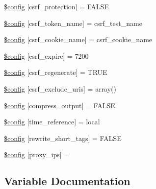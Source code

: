\begin{DoxyCompactItemize}
\item 
\hyperlink{_admin_2application_2config_2config_8php_a37f959c7a92cefa11c0df7db2b83c89f}{\$config} \mbox{[}\textquotesingle{}csrf\+\_\+protection\textquotesingle{}\mbox{]} = F\+A\+L\+S\+E
\item 
\hyperlink{_admin_2application_2config_2config_8php_af0e5ccff5383b00a56f4ad3ee0d289d2}{\$config} \mbox{[}\textquotesingle{}csrf\+\_\+token\+\_\+name\textquotesingle{}\mbox{]} = \textquotesingle{}csrf\+\_\+test\+\_\+name\textquotesingle{}
\item 
\hyperlink{_admin_2application_2config_2config_8php_ad8f36090649afb3101c3c337c1d722a1}{\$config} \mbox{[}\textquotesingle{}csrf\+\_\+cookie\+\_\+name\textquotesingle{}\mbox{]} = \textquotesingle{}csrf\+\_\+cookie\+\_\+name\textquotesingle{}
\item 
\hyperlink{_admin_2application_2config_2config_8php_af5c0ea7b77c40439da4f23b7cbb9c2e4}{\$config} \mbox{[}\textquotesingle{}csrf\+\_\+expire\textquotesingle{}\mbox{]} = 7200
\item 
\hyperlink{_admin_2application_2config_2config_8php_a5dfd346cc2377cb9dceafc813eb0d801}{\$config} \mbox{[}\textquotesingle{}csrf\+\_\+regenerate\textquotesingle{}\mbox{]} = T\+R\+U\+E
\item 
\hyperlink{_admin_2application_2config_2config_8php_a9f55fcd2fc65220aa24a95491361b75e}{\$config} \mbox{[}\textquotesingle{}csrf\+\_\+exclude\+\_\+uris\textquotesingle{}\mbox{]} = array()
\item 
\hyperlink{_admin_2application_2config_2config_8php_a5f03a6c067b921917c2d978f4991bcd1}{\$config} \mbox{[}\textquotesingle{}compress\+\_\+output\textquotesingle{}\mbox{]} = F\+A\+L\+S\+E
\item 
\hyperlink{_admin_2application_2config_2config_8php_acb20698e35bc3d4b9692a4b4619b1b05}{\$config} \mbox{[}\textquotesingle{}time\+\_\+reference\textquotesingle{}\mbox{]} = \textquotesingle{}local\textquotesingle{}
\item 
\hyperlink{_admin_2application_2config_2config_8php_a5d2e2b3f3030d1bd97f6d986ef13ace9}{\$config} \mbox{[}\textquotesingle{}rewrite\+\_\+short\+\_\+tags\textquotesingle{}\mbox{]} = F\+A\+L\+S\+E
\item 
\hyperlink{_admin_2application_2config_2config_8php_a99ce814cf767ce4e281380e6f2158b1b}{\$config} \mbox{[}\textquotesingle{}proxy\+\_\+ips\textquotesingle{}\mbox{]} = \textquotesingle{}\textquotesingle{}
\end{DoxyCompactItemize}


\subsection{Variable Documentation}
\hypertarget{_admin_2application_2config_2config_8php_a8063081991a9d7087e6aea78db95a524}{}
